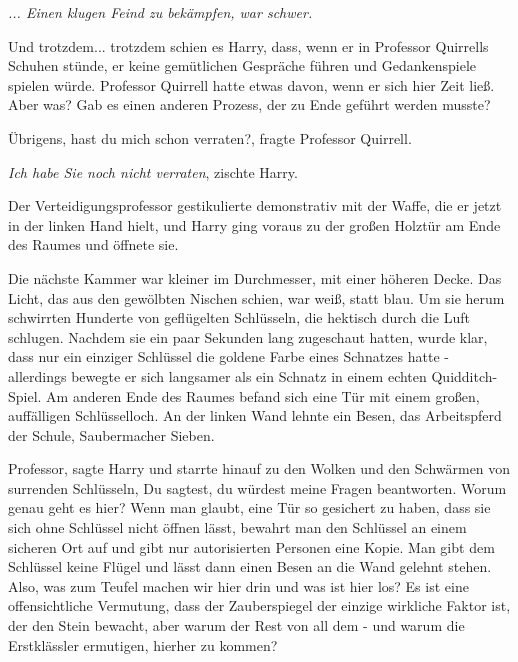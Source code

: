\emph{... Einen klugen Feind zu bekämpfen, war schwer.}

Und trotzdem... trotzdem schien es Harry, dass, wenn er in Professor Quirrells
Schuhen stünde, er keine gemütlichen Gespräche führen und Gedankenspiele spielen
würde. Professor Quirrell hatte etwas davon, wenn er sich hier Zeit ließ. Aber
was? Gab es einen anderen Prozess, der zu Ende geführt werden musste?

\glqq{}Übrigens, hast du mich schon verraten?\grqq{}, fragte Professor Quirrell.

\glqq{}\emph{Ich habe Sie noch nicht verraten}\grqq{}, zischte Harry.

Der Verteidigungsprofessor gestikulierte demonstrativ mit der Waffe, die er
jetzt in der linken Hand hielt, und Harry ging voraus zu der großen Holztür am
Ende des Raumes und öffnete sie.

Die nächste Kammer war kleiner im Durchmesser, mit einer höheren Decke. Das
Licht, das aus den gewölbten Nischen schien, war weiß, statt blau. Um sie herum
schwirrten Hunderte von geflügelten Schlüsseln, die hektisch durch die Luft
schlugen. Nachdem sie ein paar Sekunden lang zugeschaut hatten, wurde klar, dass
nur ein einziger Schlüssel die goldene Farbe eines Schnatzes hatte - allerdings
bewegte er sich langsamer als ein Schnatz in einem echten Quidditch-Spiel. Am
anderen Ende des Raumes befand sich eine Tür mit einem großen, auffälligen
Schlüsselloch. An der linken Wand lehnte ein Besen, das Arbeitspferd der Schule,
Saubermacher Sieben.

\glqq{}Professor\grqq{}, sagte Harry und starrte hinauf zu den Wolken und den
Schwärmen von surrenden Schlüsseln, \glqq{}Du sagtest, du würdest meine Fragen
beantworten. Worum genau geht es hier? Wenn man glaubt, eine Tür so gesichert zu
haben, dass sie sich ohne Schlüssel nicht öffnen lässt, bewahrt man den
Schlüssel an einem sicheren Ort auf und gibt nur autorisierten Personen eine
Kopie. Man gibt dem Schlüssel keine Flügel und lässt dann einen Besen an die
Wand gelehnt stehen. Also, was zum Teufel machen wir hier drin und was ist hier
los? Es ist eine offensichtliche Vermutung, dass der Zauberspiegel der einzige
wirkliche Faktor ist, der den Stein bewacht, aber warum der Rest von all dem -
und warum die Erstklässler ermutigen, hierher zu kommen?\grqq{}


